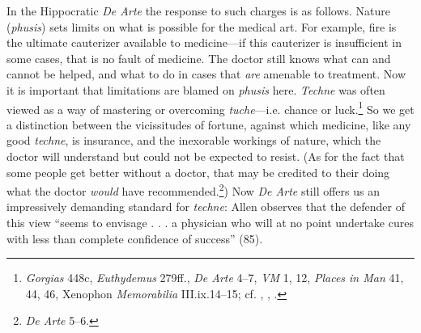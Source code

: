 ﻿\documentclass[11pt]{amsart}
\begin{document}



In the Hippocratic \emph{De Arte} the response to such charges is as follows. Nature (\emph{phusis}) sets limits on what is possible for the medical art. For example, fire is the ultimate cauterizer available to medicine---if this cauterizer is insufficient in some cases, that is no fault of medicine. The doctor still knows what can and cannot be helped, and what to do in cases that \emph{are} amenable to treatment. Now it is important that limitations are blamed on \emph{phusis} here. \emph{Techne} was often viewed as a way of mastering or overcoming \emph{tuche}---i.e. chance or luck.\footnote{\emph{Gorgias} 448c, \emph{Euthydemus} 279ff., \emph{De Arte} 4--7, \emph{VM} 1, 12, \emph{Places in Man} 41, 44, 46, Xenophon \emph{Memorabilia} III.ix.14--15; cf. \citet[54--6]{vlastos1946eap}, \citet[108, 123--4]{heinimann1961vpt}, \citet{allen1994}.} So we get a distinction between the vicissitudes of fortune, against which medicine, like any good \emph{techne}, is insurance, and the inexorable workings of nature, which the doctor will understand but could not be expected to resist. (As for the fact that some people get better without a doctor, that may be credited to their doing what the doctor \emph{would} have recommended.\footnote{\emph{De Arte} 5--6.}) Now \emph{De Arte} still offers us an impressively demanding standard for \emph{techne}: Allen observes that the defender of this view ``seems to envisage . . . a physician who will at no point undertake cures with less than complete confidence of success'' (85).







	
	
\end{document}

